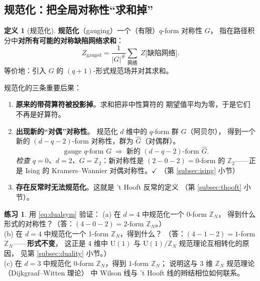 \documentclass[UTF8,a4paper,11pt]{ctexart}
\theoremstyle{plain}
\theoremstyle{definition}
\newtheorem{definition}{定义}[section]
\newtheorem{exercise}{练习}[section]
\theoremstyle{remark}
\newcommand{\ZZ}{\mathbb{Z}}
\newcommand{\Uone}{\mathrm{U}(1)}
\newcommand{\en}[1]{\textsf{#1}}       %
\begin{document}
\subsection{规范化：把全局对称性“求和掉”}
\label{subsec:gauging}

\begin{definition}[规范化]
\textbf{规范化}（\en{gauging}）一个（有限）$q$-form 对称性 $G$，
指在路径积分中\textbf{对所有可能的对称缺陷网络求和}：
\begin{equation}
  Z_{\text{gauged}}
  =\frac{1}{|G|^{\#}}\sum_{\text{网络}}\;Z\big[\text{缺陷网络}\big].
  \label{eq:gauge-sum}
\end{equation}
等价地：引入 $G$ 的 $(q+1)$-形式规范场并对其求和。
\end{definition}

规范化的三条重要后果：

\begin{enumerate}[label=(\arabic*)]
  \item \textbf{原来的带荷算符被投影掉}。求和把非中性算符的
        期望值平均为零，于是它们不再是好算符。
  \item \textbf{出现新的“对偶”对称性}。
        规范化 $d$ 维中的 $q$-form 群 $G$（阿贝尔），
        得到一个新的 $(d-q-2)$-form 对称性，群为 $\hat G$（对偶群）。
        \begin{equation}
          \text{gauge } q\text{-form } G
          \;\Longrightarrow\;
          \text{新的 } (d-q-2)\text{-form } \hat G .
          \label{eq:dualsym}
        \end{equation}
        \emph{检查 $q=0$、$d=2$、$G=\ZZ_2$}：新对称性是
        $(2-0-2)=0$-form 的 $\ZZ_2$——正是 Ising 的
        Kramers--Wannier 对偶对称性。$\checkmark$
        （第 \ref{subsec:ising} 小节）
  \item \textbf{存在反常时无法规范化}。这就是 't Hooft 反常的定义
        （第 \ref{subsec:thooft} 小节）。
\end{enumerate}

\begin{exercise}
\label{ex:gaugecheck}
用 \eqref{eq:dualsym} 验证：
(a) 在 $d=4$ 中规范化一个 0-form $\ZZ_N$，
得到什么形式的对称性？（答：$(4-0-2)=2$-form $\ZZ_N$。）\\
(b) 在 $d=4$ 中规范化一个 1-form $\ZZ_N$，得到什么？
（答：$(4-1-2)=1$-form $\ZZ_N$——\textbf{形式不变}，
这正是 4 维中 $\Uone$ 与 $\Uone/\ZZ_N$ 规范理论互相转化的原因，
见第 \ref{subsec:duality} 小节。）\\
(c) 在 $d=3$ 中规范化 0-form $\ZZ_N$，得到 $1$-form $\ZZ_N$；
说明这与 3 维 $\ZZ_N$ 规范理论（Dijkgraaf--Witten 理论）
中 Wilson 线与 't Hooft 线的辫结相位如何联系。
\end{exercise}
\end{document}
